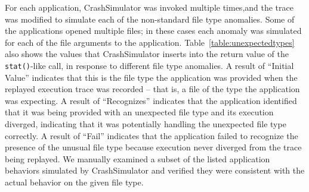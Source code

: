 For each application, CrashSimulator was invoked multiple times,and
the trace was modified
to simulate each of the non-standard file type anomalies.  Some
of the applications opened multiple files; in these cases each anomaly was
simulated for each of the file arguments to the application.
Table~\ref{table:unexpectedtypes} also shows the values that CrashSimulator
inserts into the return value of the {\tt stat()}-like call,
in response to
different file type anomalies.  A result of ``Initial Value'' indicates
that this is the file type the application was provided when the replayed
execution trace was recorded -- that is, a file of the type the application
was expecting.  A result of ``Recognizes'' indicates that the application
identified that it was being provided with an unexpected file type and its
execution diverged, indicating that it was potentially handling the
unexpected file type correctly.  A result of ``Fail'' indicates that the
application failed to recognize the presence of the unusual file type
because execution never diverged from the trace being replayed.  We
manually examined a subset of the listed application behaviors simulated by
CrashSimulator and verified they were consistent with the actual behavior
on the given file type.

